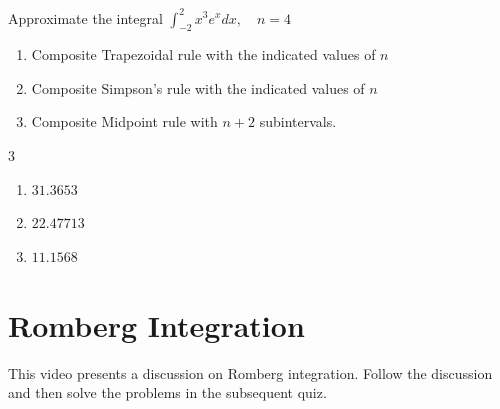 \begin{myexercise}%
Approximate the integral $\int_{-2}^{2} x^{3} e^{x} d x, \quad n=4$
\begin{enumerate}[label=(\alph*)]
\item Composite Trapezoidal rule with the indicated values of $n$
\item Composite Simpson's rule with the indicated values of $n$
\item Composite Midpoint rule with $n+2$ subintervals.
\end{enumerate}

\begin{mysolution}
\begin{multicols}{3}
\begin{enumerate}[label=(\alph*)]
\item $31.3653$
\item $22.47713$
\item $11.1568$
\end{enumerate}
\end{multicols}
\end{mysolution}
\end{myexercise}

\section{Romberg Integration}

\begin{youtube}
This video presents a discussion on Romberg integration. Follow the discussion and then solve the problems in the subsequent quiz.
\end{youtube}


